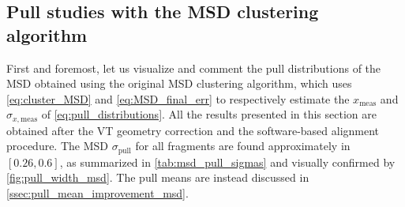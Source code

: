 \subsection{Pull studies with the MSD clustering algorithm}\label{ssec:pull_studies_msd_clustering_algorithm}
First and foremost, let us visualize and comment the pull distributions of the MSD obtained using the original MSD clustering algorithm, which uses \autoref{eq:cluster_MSD} and \autoref{eq:MSD_final_err} to respectively estimate the $x_{\text{meas}}$ and $\sigma_{x,\text{meas}}$ of \autoref{eq:pull_distributions}. All the results presented in this section are obtained after the VT geometry correction and the software-based alignment procedure. The MSD $\sigma_\text{pull}$ for all fragments are found approximately in $[0.26,0.6]$, as summarized in \autoref{tab:msd_pull_sigmas} and visually confirmed by \autoref{fig:pull_width_msd}. The pull means are instead discussed in \autoref{ssec:pull_mean_improvement_msd}.

